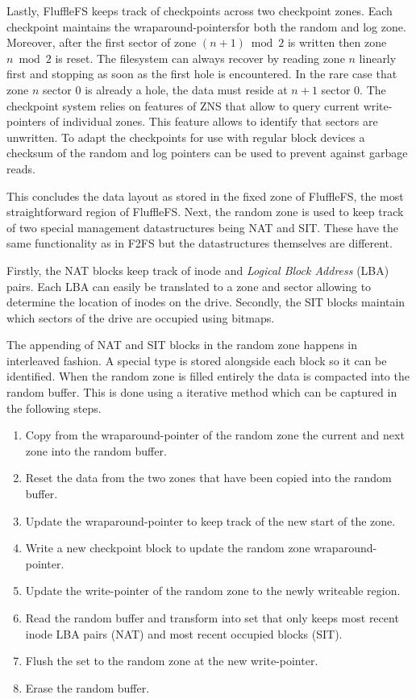 Lastly, FluffleFS keeps track of checkpoints across two checkpoint zones. Each
checkpoint maintains the wraparound-pointers\footnotemark[12] for both the random
and log zone. Moreover, after the first sector of zone $(n+1) \bmod{2}$ is
written then zone $n \bmod{2}$ is reset. The filesystem can always recover by
reading zone $n$ linearly first and stopping as soon as the first hole is
encountered. In the rare case that zone $n$ sector $0$ is already a hole, the
data must reside at $n+1$ sector $0$. The checkpoint system relies on features
of ZNS that allow to query current write-pointers of individual zones. This
feature allows to identify that sectors are unwritten. To adapt the checkpoints
for use with regular block devices a checksum of the random and log pointers can
be used to prevent against garbage reads.


This concludes the data layout as stored in the fixed zone of FluffleFS, the
most straightforward region of FluffleFS. Next, the random zone is used to keep
track of two special management datastructures being NAT and SIT. These have the
same functionality as in F2FS but the datastructures themselves are different.

Firstly, the NAT blocks keep track of inode and \textit{Logical Block Address}
(LBA) pairs. Each LBA can easily be translated to a zone and sector allowing to
determine the location of inodes on the drive. Secondly, the SIT blocks
maintain which sectors of the drive are occupied using bitmaps.

The appending of NAT and SIT blocks in the random zone happens in interleaved
fashion. A special type is stored alongside each block so it can be identified.
When the random zone is filled entirely the data is compacted into the random
buffer. This is done using a iterative method which can be captured in the
following steps.

\begin{enumerate}
    \item Copy from the wraparound-pointer of the random zone the current and
    next zone into the random buffer.
    \item Reset the data from the two zones that have been copied into the
    random buffer.
    \item Update the wraparound-pointer to keep track of the new start of the
    zone.
    \item Write a new checkpoint block to update the random zone
    wraparound-pointer.
    \item Update the write-pointer of the random zone to the newly writeable
    region.
    \item Read the random buffer and transform into set that only keeps
    most recent inode LBA pairs (NAT) and most recent occupied blocks (SIT).
    \item Flush the set to the random zone at the new write-pointer.
    \item Erase the random buffer.
\end{enumerate}

